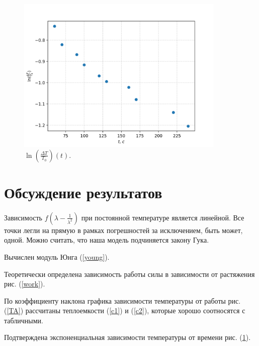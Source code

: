 \documentclass[a4paper,12pt]{article} %
\begin{document}
\begin{figure}[h!]\label{Tt}
\begin{center}
\includegraphics[width=0.89\textwidth]{T(t).png}
\caption{$\ln(\frac{\Delta T}{T_0})(t)$.}
\end{center}
\end{figure}

\FloatBarrier

\section{Обсуждение результатов}

Зависимость $f(\lambda - \frac{1}{\lambda^2})$ при постоянной температуре является линейной. Все точки легли на прямую в рамках погрешностей за исключением, быть может, одной. Можно считать, что наша модель подчиняется закону Гука.

Вычислен модуль Юнга (\ref{young}).

Теоретически определена зависимость работы силы в зависимости от растяжения рис. (\ref{work}).

По коэффициенту наклона графика зависимости температуры от работы рис. (\ref{TA}) рассчитаны теплоемкости (\ref{c1}) и (\ref{c2}), которые хорошо соотносятся с табличными.

Подтверждена экспоненциальная зависимости температуры от времени рис. (\ref{Tt}).
\end{document}
